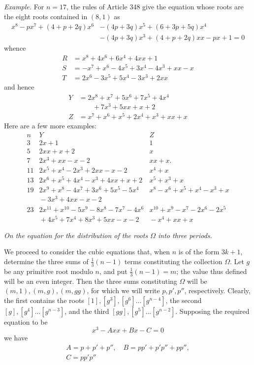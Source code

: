 \textit{Example.} For \(n=17\), the rules of Article 348 give the equation whose roots are the eight roots contained in \((8,1)\) as \[\begin{aligned}x^8-px^7+(4+p+2q)x^6&-(4p+3q)x^5+(6+3p+5q)x^4\\&-(4p+3q)x^3+(4+p+2q)xx-px+1=0\end{aligned}\] whence \[\begin{aligned}R&=x^8+4x^6+6x^4+4xx+1\\S&=-x^7+x^6-4x^5+3x^4-4x^3+xx-x\\T&=2x^6-3x^5+5x^4-3x^3+2xx\end{aligned}\] and hence \[\begin{aligned}Y&=2x^8+x^7+5x^6+7x^5+4x^4\\&\qquad+7x^3+5xx+x+2\\Z&=x^7+x^6+x^5+2x^4+x^3+xx+x\end{aligned}\] Here are a few more examples: {\small\setlength{\arraycolsep}{4pt}\[\begin{array}{c|l|l}n&Y&Z\\\hline 3&2x+1&1\\5&2xx+x+2&x\\7&2x^3+xx-x-2&xx+x.\\11&2x^5+x^4-2x^3+2xx-x-2&x^4+x\\13&2x^6+x^5+4x^4-x^3+4xx+x+2&x^5+x^3+x\\19&2x^9+x^8-4x^7+3x^6+5x^5-5x^4&x^8-x^6+x^5+x^4-x^3+x\\{}&{}-3x^3+4xx-x-2&{}\\23&2x^{11}+x^{10}-5x^9-8x^8-7x^7-4x^6&x^{10}+x^9-x^7-2x^6-2x^5\\{}&{}+4x^5+7x^4+8x^3+5xx-x-2&{}-x^4+xx+x\end{array}\]}

\begin{center}\itshape \textit{On the equation for the distribution of the roots \(\Omega\) into three periods.}\end{center}


We proceed to consider the cubic equations that, when \(n\) is of the form \(3k+1\), determine the three sums of \(\frac13(n-1)\) terms constituting the collection \(\Omega\). Let \(g\) be any primitive root modulo \(n\), and put \(\frac13(n-1)=m\); the value thus defined will be an even integer. Then the three sums constituting \(\Omega\) will be \((m,1),\allowbreak (m,g),\allowbreak (m,gg)\), for which we will write \(p,\allowbreak p',\allowbreak p''\), respectively. Clearly, the first contains the roots \([1],\allowbreak [g^3],\allowbreak [g^6]\ldots[g^{n-4}]\), the second \([g],\allowbreak [g^4]\ldots[g^{n-3}]\), and the third \([gg],\allowbreak [g^5]\ldots[g^{n-2}]\). Supposing the required equation to be \[x^3-Axx+Bx-C=0\] we have \[\begin{gathered}A=p+p'+p'',\quad B=pp'+p'p''+pp'',\\C=pp'p''\end{gathered}\]

